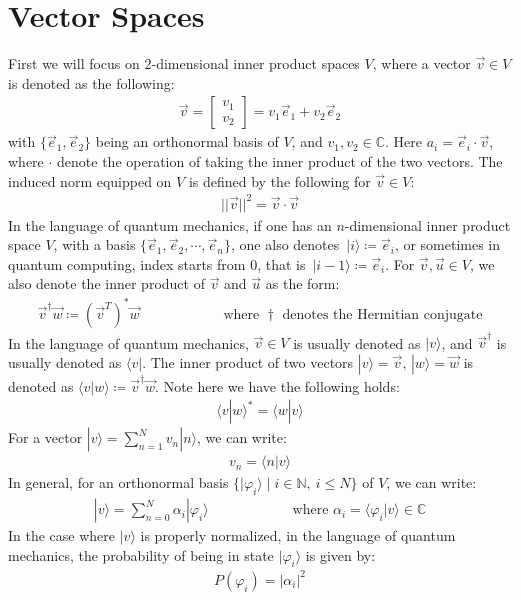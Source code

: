 \documentclass[11pt]{book}
\theoremstyle{break}
\theoremstyle{break}
\newcommand{\N}{\mathbb{N}}
\newcommand{\C}{\mathbb{C}}
\newcommand{\bmat}[1]{\begin{bmatrix} #1 \end{bmatrix}}
\newcommand{\ket}[1]{\,| #1 \rangle}
\begin{document}
\section[Vector Spaces]{\color{red}Vector Spaces\color{black}}
First we will focus on $2$-dimensional inner product spaces $V$, where a vector $\vec{v}\in V$ is denoted as the following:
\begin{align*}
\vec{v} = \bmat{v_1 \\ v_2} = v_1 \vec{e}_1 + v_2 \vec{e}_2
\end{align*} 
with $\{\vec{e}_1,\vec{e}_2\}$ being an orthonormal basis of $V$, and $v_1,v_2 \in \C$. Here $a_i = \vec{e}_i \cdot \vec{v}$, where $\cdot$ denote the operation of taking the inner product of the two vectors. The induced norm equipped on $V$ is defined by the following for $\vec{v} \in V$:
\begin{align*}
||\vec{v}||^2 = \vec{v}\cdot \vec{v}
\end{align*}
In the language of quantum mechanics, if one has an $n$-dimensional inner product space $V$, with a basis $\{ \vec{e}_1,\vec{e}_2,\cdots,\vec{e}_n\}$, one also denotes $\ket{i}\coloneqq\vec{e}_i$, or sometimes in quantum computing, index starts from $0$, that is $\ket{i-1} \coloneqq \vec{e}_i$. For $\vec{v},\vec{u}\in V$, we also denote the inner product of $\vec{v}$ and $\vec{u}$ as the form:
\begin{align*}
\vec{v}^\dagger \vec{w} \coloneqq (\vec{v}^T)^*\vec{w}  \qquad\qquad\qquad\text{where }\dagger \text{ denotes the Hermitian conjugate}
\end{align*}
In the language of quantum mechanics, $\vec{v}\in V$ is usually denoted as $|v\rangle$, and $\vec{v}^\dagger$ is usually denoted as $\langle v|$. The inner product of two vectors $|v\rangle=\vec{v}, \, |w\rangle=\vec{w}$ is denoted as $\langle v|w\rangle\coloneqq \vec{v}^\dagger \vec{w}$. Note here we have the following holds:
\begin{align*}
\langle v|w\rangle^* = \langle w | v\rangle
\end{align*}
For a vector $|v\rangle = \sum_{n=1}^N v_n|n\rangle$, we can write:
\begin{align*}
v_n = \langle n |v\rangle
\end{align*}
In general, for an orthonormal basis $\{|\varphi_i\rangle \mid i\in \N,\ i\leq N\}$ of $V$, we can write:
\begin{align*}
|v\rangle = \sum_{n=0}^N \alpha_i |\varphi_i\rangle \qquad \qquad \qquad \text{where }\alpha_i = \langle \varphi_i | v\rangle \in \C
\end{align*}
In the case where $|v\rangle$ is properly normalized, in the language of quantum mechanics, the probability of being in state $|\varphi_i\rangle$ is given by:
\begin{align*}
P(\varphi_i) = |\alpha_i|^2
\end{align*}
\end{document}
